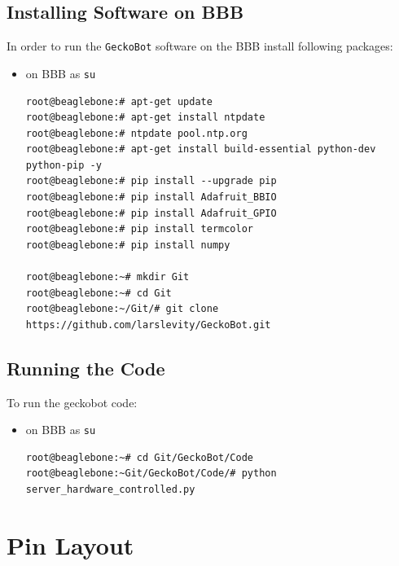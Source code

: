 \documentclass[
	fontsize=10pt
	paper=a4
]{scrartcl}
\begin{document}
\subsection{Installing Software on BBB}
In order to run the \texttt{GeckoBot} software on the BBB install following packages:
\begin{itemize}
\item on BBB as \texttt{su}
\begin{lstlisting}
root@beaglebone:# apt-get update
root@beaglebone:# apt-get install ntpdate
root@beaglebone:# ntpdate pool.ntp.org
root@beaglebone:# apt-get install build-essential python-dev python-pip -y
root@beaglebone:# pip install --upgrade pip
root@beaglebone:# pip install Adafruit_BBIO
root@beaglebone:# pip install Adafruit_GPIO
root@beaglebone:# pip install termcolor
root@beaglebone:# pip install numpy

root@beaglebone:~# mkdir Git
root@beaglebone:~# cd Git
root@beaglebone:~/Git/# git clone https://github.com/larslevity/GeckoBot.git

\end{lstlisting}
\end{itemize}



\subsection{Running the Code}
To run the geckobot code:
\begin{itemize}
\item on BBB as \texttt{su}
\begin{lstlisting}
root@beaglebone:~# cd Git/GeckoBot/Code
root@beaglebone:~Git/GeckoBot/Code/# python server_hardware_controlled.py
\end{lstlisting}
\end{itemize}




\clearpage

\section{Pin Layout}
\end{document}
